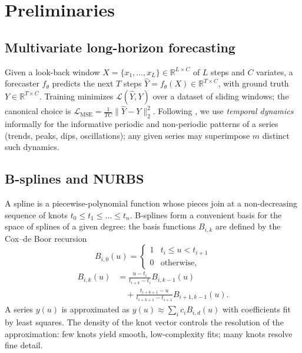 \documentclass[11pt,twocolumn]{article}
\begin{document}
\section{Preliminaries}
\label{sec:prelim}

\subsection{Multivariate long-horizon forecasting}
Given a look-back window $X = \{x_1,\dots,x_L\} \in \mathbb{R}^{L \times C}$ of $L$ steps and $C$ variates, a forecaster $f_\theta$ predicts the next $T$ steps $\hat{Y} = f_\theta(X) \in \mathbb{R}^{T \times C}$, with ground truth $Y \in \mathbb{R}^{T \times C}$. Training minimizes $\mathcal{L}(\hat{Y}, Y)$ over a dataset of sliding windows; the canonical choice is $\mathcal{L}_{\mathrm{MSE}} = \frac{1}{TC}\lVert \hat{Y} - Y \rVert_2^2$. Following \citet{tilde-q}, we use \emph{temporal dynamics} informally for the informative periodic and non-periodic patterns of a series (trends, peaks, dips, oscillations); any given series may superimpose $m$ distinct such dynamics.

\subsection{B-splines and NURBS}
A spline is a piecewise-polynomial function whose pieces join at a non-decreasing sequence of knots $t_0 \le t_1 \le \dots \le t_n$. B-splines form a convenient basis for the space of splines of a given degree: the basis functions $B_{i,k}$ are defined by the Cox--de Boor recursion \citep{deboor}
\begin{equation}
B_{i,0}(u) = \begin{cases} 1 & t_i \leq u < t_{i+1} \\ 0 & \text{otherwise,} \end{cases}
\end{equation}
\begin{equation}
\begin{split}
B_{i,k}(u) &= \frac{u - t_i}{t_{i+k} - t_i} B_{i,k-1}(u) \\
&\quad + \frac{t_{i+k+1} - u}{t_{i+k+1} - t_{i+1}} B_{i+1,k-1}(u).
\end{split}
\end{equation}
A series $y(u)$ is approximated as $y(u) \approx \sum_i c_i B_{i,d}(u)$ with coefficients fit by least squares. The density of the knot vector controls the resolution of the approximation: few knots yield smooth, low-complexity fits; many knots resolve fine detail.
\end{document}
